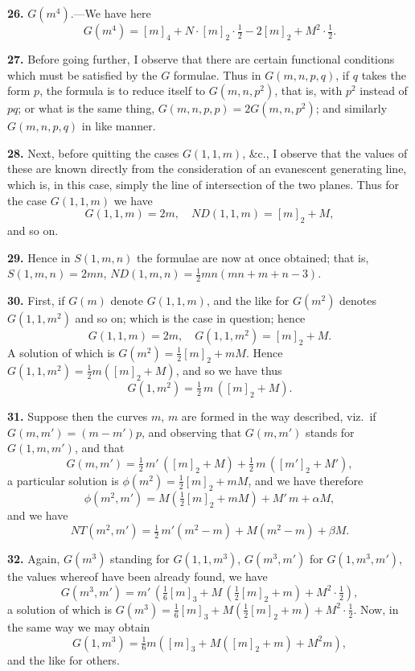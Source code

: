 \documentclass[11pt,a4paper]{article}
\begin{document}
\medskip

\textbf{26.} $G(m^4)$.---We have here
\[
G(m^4) = [m]_4 + N \cdot [m]_2 \cdot \tfrac{1}{2} - 2[m]_2 + M^2 \cdot \tfrac{1}{2}.
\]

\medskip

\textbf{27.} Before going further, I observe that there are certain functional conditions which must be satisfied by the $G$ formulae. Thus in $G(m, n, p, q)$, if $q$ takes the form $p$, the formula is to reduce itself to $G(m, n, p^2)$, that is, with $p^2$ instead of $pq$; or what is the same thing, $G(m, n, p, p) = 2 G(m, n, p^2)$; and similarly $G(m, n, p, q)$ in like manner.

\medskip

\textbf{28.} Next, before quitting the cases $G(1, 1, m)$, \&c., I observe that the values of these are known directly from the consideration of an evanescent generating line, which is, in this case, simply the line of intersection of the two planes. Thus for the case $G(1, 1, m)$ we have
\[
G(1, 1, m) = 2m,\quad ND(1, 1, m) = [m]_2 + M,
\]
and so on.

\medskip

\textbf{29.} Hence in $S(1, m, n)$ the formulae are now at once obtained; that is, $S(1, m, n) = 2mn$, $ND(1, m, n) = \frac{1}{2} mn (mn + m + n - 3)$.

\medskip

\textbf{30.} First, if $G(m)$ denote $G(1, 1, m)$, and the like for $G(m^2)$ denotes $G(1, 1, m^2)$ and so on; which is the case in question; hence
\[
G(1, 1, m) = 2m,\quad G(1, 1, m^2) = [m]_2 + M.
\]
A solution of which is $G(m^2) = \frac{1}{2}[m]_2 + m M$. Hence $G(1, 1, m^2) = \frac{1}{2}m([m]_2 + M)$, and so we have thus
\[
G(1, m^2) = \tfrac{1}{2}\,m\,([m]_2 + M).
\]

\medskip

\textbf{31.} Suppose then the curves $m$, $m$ are formed in the way described, viz.\ if $G(m, m') = (m-m')p$, and observing that $G(m, m')$ stands for $G(1, m, m')$, and that
\[
G(m, m') = \tfrac{1}{2}\,m'\,([m]_2 + M) + \tfrac{1}{2}\,m\,([m']_2 + M'),
\]
a particular solution is $\phi(m^2) = \frac{1}{2}[m]_2 + mM$, and we have therefore
\[
\phi(m^2, m') = M(\tfrac{1}{2}[m]_2 + mM) + M'\,m + \alpha M,
\]
and we have
\[
NT(m^2, m') = \tfrac{1}{2}\,m'(m^2 - m) + M(m^2 - m) + \beta M.
\]

\medskip

\textbf{32.} Again, $G(m^3)$ standing for $G(1, 1, m^3)$, $G(m^3, m')$ for $G(1, m^3, m')$, the values whereof have been already found, we have
\[
G(m^3, m') = m'\,(\tfrac{1}{6}[m]_3 + M\,(\tfrac{1}{2}[m]_2 + m) + M^2 \cdot \tfrac{1}{2}),
\]
a solution of which is $G(m^3) = \frac{1}{6}[m]_3 + M(\frac{1}{2}[m]_2 + m) + M^2 \cdot \frac{1}{2}$. Now, in the same way we may obtain
\[
G(1, m^3) = \tfrac{1}{6}m([m]_3 + M([m]_2 + m) + M^2 m),
\]
and the like for others.
\end{document}

